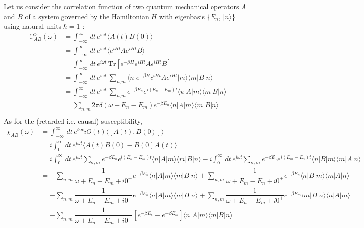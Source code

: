 \documentclass[aps,prb,onecolumn,notitlepage,showpacs,floatfix,superscriptaddress]{revtex4-1}
\newcommand{\mrm}[1]{\mathrm{#1}}
\newcommand{\cgr}{C^{>}_{AB}}
\begin{document}
Let us consider the correlation function of two quantum mechanical operators $A$ and $B$ of a system governed by the Hamiltonian $H$ with eigenbasis \{$E_n$, $\vert n \rangle$\} using natural units $\hbar=1$ :
\begin{equation}
\begin{split}
\cgr (\omega) &= \int_{-\infty}^{\infty} \, dt \, e^{i \omega t} \langle A(t) B(0) \rangle \\
&= \int_{-\infty}^{\infty} \, dt \, e^{i \omega t} \langle e^{i H t} A e^{i H t} B \rangle \\
&= \int_{-\infty}^{\infty} \, dt \, e^{i \omega t} \, \mrm{Tr} \left[ e^{-\beta H} e^{i H t} A e^{i H t} B \right] \\
&= \int_{-\infty}^{\infty} \, dt \, e^{i \omega t} \, \sum_{n,m} \langle n \vert  e^{-\beta H} e^{i H t} A e^{i H t} \vert m \rangle \langle m \vert  B \vert n \rangle \\
&= \int_{-\infty}^{\infty} \, dt \, e^{i \omega t} \, \sum_{n,m} e^{-\beta E_n } e^{i (E_n - E_m) t} \langle n \vert  A \vert m \rangle \langle m \vert  B \vert n \rangle \\
&=  \sum_{n,m} 2 \pi \delta(\omega + E_n - E_m) e^{-\beta E_n } \langle n \vert  A \vert m \rangle \langle m \vert  B \vert n \rangle \\
\end{split}
\end{equation}
As for the (retarded i.e. causal) susceptibility,
\begin{equation}
\begin{split}
\chi_{AB} (\omega) &=  \int_{-\infty}^{\infty} \, dt \, e^{i \omega t} i \Theta(t) \langle [A(t),B(0)] \rangle \\
&=  i \int_{0}^{\infty} \, dt \, e^{i \omega t}  \langle A(t) B(0) - B(0) A(t) \rangle \\
&=  i \int_{0}^{\infty} \, dt \, e^{i \omega t} \sum_{n,m} e^{-\beta E_n } e^{i (E_n - E_m) t}  \langle n \vert  A \vert m \rangle \langle m \vert  B \vert n \rangle - i \int_{0}^{\infty} \, dt \, e^{i \omega t} \sum_{n,m} e^{-\beta E_n } e^{i (E_m - E_n) t}  \langle n \vert  B \vert m \rangle \langle m \vert  A \vert n \rangle\\
&=  - \sum_{n,m} \dfrac{1}{\omega + E_n -E_m +i 0^+} e^{-\beta E_n } \langle n \vert  A \vert m \rangle \langle m \vert  B \vert n \rangle + \sum_{n,m} \dfrac{1}{\omega + E_m -E_n + i 0^+}e^{-\beta E_n }  \langle n \vert  B \vert m \rangle \langle m \vert  A \vert n \rangle\\
&=  - \sum_{n,m} \dfrac{1}{\omega + E_n -E_m +i 0^+} e^{-\beta E_n } \langle n \vert  A \vert m \rangle \langle m \vert  B \vert n \rangle + \sum_{n,m} \dfrac{1}{\omega + E_n -E_m + i 0^+}e^{-\beta E_m }  \langle m \vert  B \vert n \rangle \langle n \vert  A \vert m \rangle\\
&=  - \sum_{n,m} \dfrac{1}{\omega + E_n -E_m +i 0^+} \left[ e^{-\beta E_n }-e^{-\beta E_m } \right]\langle n \vert  A \vert m \rangle \langle m \vert  B \vert n \rangle \\
\end{split}
\end{equation}
\end{document}
